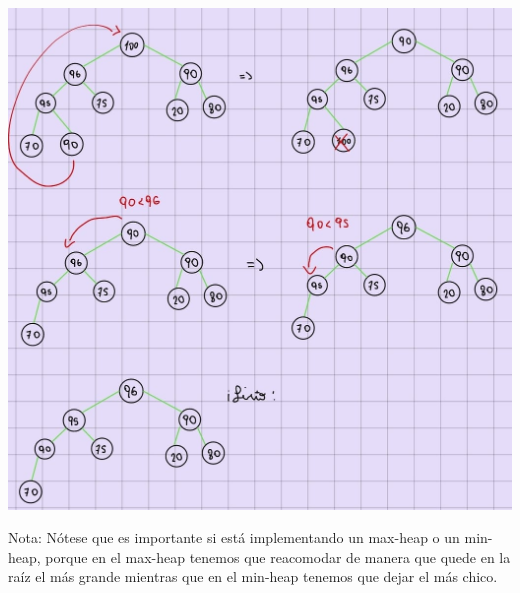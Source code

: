 \documentclass[10pt,a4paper]{article}
\begin{document}
\begin{center}
    \begin{minipage}[b]{0.5\textwidth}
        \includegraphics[width=\linewidth]{assets/borrar_heaps.jpg}
        \centering
        \label{fig:borrar_heaps}
    \end{minipage}
\end{center}
Nota: Nótese que es importante si está implementando un max-heap o un min-heap, porque en el max-heap tenemos que reacomodar de manera que quede en la raíz el más grande mientras que en el min-heap tenemos que dejar el más chico.
\end{document}
